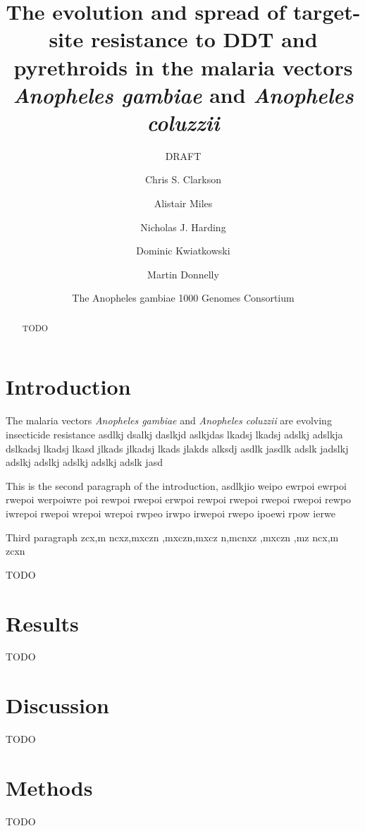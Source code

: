 \documentclass[a4paper,10pt,abstracton]{scrartcl}
\title{The evolution and spread of target-site resistance to DDT and pyrethroids in the malaria vectors \emph{Anopheles gambiae} and \emph{Anopheles coluzzii}}
\subtitle{DRAFT}
\author{
	Chris S. Clarkson
	\and 
	Alistair Miles
	\and
	Nicholas J. Harding
	\and
	Dominic Kwiatkowski
	\and
	Martin Donnelly
	\and
	The Anopheles gambiae 1000 Genomes Consortium
}
\begin{document}
\maketitle

\begin{abstract}

TODO

\end{abstract}

\section*{Introduction}

The malaria vectors \emph{Anopheles gambiae} and \emph{Anopheles coluzzii} are evolving insecticide resistance asdlkj dsalkj daslkjd aslkjdas lkadsj lkadsj adslkj 
adslkja dslkadsj lkadsj lkasd jlkads jlkadsj lkads jlakds alksdj asdlk jasdlk adslk jadslkj adslkj adslkj adslkj adslkj adslk jasd

This is the second paragraph of the introduction, asdlkjio weipo ewrpoi ewrpoi rwepoi werpoiwre poi rewpoi rwepoi erwpoi rewpoi rwepoi rwepoi rwepoi rewpo iwrepoi rwepoi wrepoi 
wrepoi rwpeo irwpo irwepoi rwepo ipoewi rpow ierwe

Third paragraph zcx,m ncxz,mxczn ,mxczn,mxcz n,mcnxz ,mxczn ,mz ncx,m zcxn

TODO

\section*{Results}

TODO

\section*{Discussion}

TODO

\section*{Methods}

TODO
\end{document}
